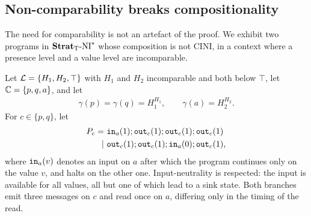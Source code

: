 \documentclass[preprint,5p,twocolumn]{elsarticle}
\begin{document}

\subsection{Non-comparability breaks compositionality}

\label{sec:presence needed}

The need for comparability is not an artefact of the proof.
We exhibit two programs in $\mathbf{Strat}_{\mathrm{T}}\text{-}\mathrm{NI}^*$
whose composition is not CINI, in a context where a presence level and a value level are
incomparable. 

Let $\mathcal{L} = \lbrace H_1, H_2, \top \rbrace$ with $H_1$ and $H_2$ incomparable and both below
$\top$, let $\mathbb{C} = \lbrace p, q, a \rbrace$, and let
\begin{align*}
  \gamma(p) = \gamma(q) = H_1^{H_1}, \qquad \gamma(a) = H_2^{H_2}.
\end{align*}
For $c \in \lbrace p, q \rbrace$, let
\begin{align*}
  P_c =~& \mathtt{in}_{a}(1); \mathtt{out}_{c}(1); \mathtt{out}_{c}(1); \mathtt{out}_{c}(1) \\
   \mid~& \mathtt{out}_{c}(1); \mathtt{out}_{c}(1); \mathtt{in}_{a}(0); \mathtt{out}_{c}(1),
\end{align*}
where $\mathtt{in}_{a}(v)$ denotes an input on $a$ after which the program continues only on the value $v$,
and halts on the other one. Input-neutrality is respected: the input is available for all values,
all but one of which lead to a sink state. Both branches emit three messages on $c$ and read
once on $a$, differing only in the timing of the read.
\end{document}
